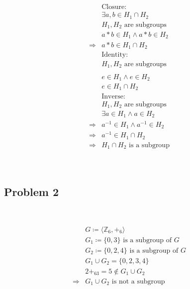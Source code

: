 \documentclass{article}
\begin{document}
\begin{equation*}
    \begin{split}
        &\text{Closure}:\\
        &\exists a,b\in H_1\cap H_2\\
        &H_1,H_2\text{ are subgroups}\\
        &a\ast b\in H_1\land a\ast b\in H_2\\
        \Rightarrow&a\ast b\in H_1\cap H_2\\
        &\text{Identity}:\\
        &H_1,H_2\text{ are subgroups}\\\\
        &e\in H_1\land e\in H_2\\
        &e\in H_1\cap H_2\\
        &\text{Inverse}:\\
        &H_1,H_2\text{ are subgroups}\\
        &\exists a\in H_1\land a\in H_2\\
        \Rightarrow&a^{-1}\in H_1\land a^{-1}\in H_2\\
        \Rightarrow&a^{-1}\in H_1\cap H_2\\
        \Rightarrow&H_1\cap H_2\text{ is a subgroup}\\
    \end{split}
\end{equation*}

~

\subsection*{Problem 2}

~

\begin{equation*}
    \begin{split}
        &G\coloneqq \langle \mathbb{Z}_6 ,+_6\rangle\\
        &G_1\coloneqq\{0,3\}\text{ is a subgroup of }G\\
        &G_2\coloneqq\{0,2,4\}\text{ is a subgroup of }G\\
        &G_1\cup G_2=\{0,2,3,4\}\\
        &2+_63=5\notin G_1\cup G_2\\
        \Rightarrow&G_1\cup G_2\text{ is not a subgroup}\\
    \end{split}
\end{equation*}
\end{document}
